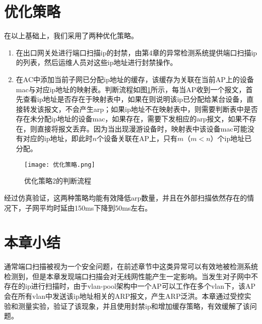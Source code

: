 \section{优化策略}
在以上基础上，我们采用了两种优化策略。
\begin{enumerate}
  \item 在出口网关处进行端口扫描ip的封禁，由第4章的异常检测系统提供端口扫描ip的列表，然后运维人员对这些ip地址进行封禁操作。
  \item 在AC中添加当前子网已分配ip地址的缓存，该缓存为关联在当前AP上的设备mac与对应ip地址的映射表。判断流程如图\ref{fig:优化策略}所示，每当AP收到一个报文，首先查看ip地址是否存在于映射表中，如果在则说明该ip已分配给某台设备，直接转发该报文，不会产生arp；如果ip地址不在映射表中，则需要判断表中是否存在未分配ip地址的设备mac，如果存在，需要下发相应的arp报文，如果不存在，则直接将报文丢弃。因为当出现漫游设备时，映射表中该设备mac可能没有对应的ip地址，即此时$n$个设备关联在AP上，只有$m$（$m<n$）个ip地址已分配。
\end{enumerate}
\begin{figure}
  \centering
  \texttt{[image: 优化策略.png]}
  \caption{优化策略2的判断流程}
  \label{fig:优化策略}
\end{figure}
经过仿真验证，这两种策略均能有效降低arp数量，并且在外部扫描依然存在的情况下，子网平均时延由150ms下降到50ms左右。


\section{本章小结}
通常端口扫描被视为一个安全问题，在前述章节中这类异常可以有效地被检测系统检测到，但是本章发现端口扫描会对无线网性能产生一定影响。当发生对子网中不存在的ip进行扫描时，由于vlan-pool架构中一个AP可以工作在多个vlan下，该AP会在所有vlan中发送该ip地址相关的ARP报文，产生ARP泛洪。本章通过受控实验和测量实验，验证了该现象，并且使用封禁ip和增加缓存策略，有效缓解了该问题。